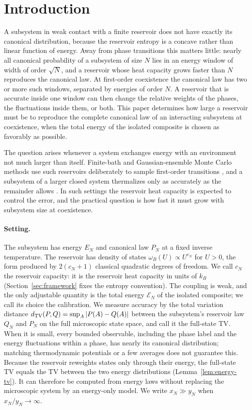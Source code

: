 \section{Introduction}
\label{sec:introduction}

A subsystem in weak contact with a finite reservoir does not have
exactly its canonical distribution, because the reservoir entropy is a
concave rather than linear function of energy. Away from phase
transitions this matters little: nearly all canonical probability of a
subsystem of size $N$ lies in an energy window of width of order
$\sqrt N$, and a reservoir whose heat capacity grows faster than $N$
reproduces the canonical law. At first-order coexistence the canonical
law has two or more such windows, separated by energies of order $N$.
A reservoir that is accurate inside one window can then change the
relative weights of the phases, the fluctuations inside them, or both.
This paper determines how large a reservoir must be to reproduce the
complete canonical law of an interacting subsystem at coexistence, when
the total energy of the isolated composite is chosen as favorably as
possible.

The question arises whenever a system exchanges energy with an
environment not much larger than itself. Finite-bath and
Gaussian-ensemble Monte Carlo methods use such reservoirs deliberately
to sample first-order transitions
\cite{ChallaHetherington1988PRA,GriffinMattySwendsen2017}, and a
subsystem of a larger closed system thermalizes only as accurately as
the remainder allows \cite{RieraGogolinEisert2012}. In such settings
the reservoir heat capacity is expected to control the error, and the
practical question is how fast it must grow with subsystem size at
coexistence.

\paragraph{Setting.}
The subsystem has energy $E_N$ and canonical law $P_N$ at a fixed
inverse temperature. The reservoir has density of states
$\omega_B(U)\propto U^{c_N}$ for $U>0$, the form produced by
$2(c_N+1)$ classical quadratic degrees of freedom. We call $c_N$ the
reservoir capacity: it is the reservoir heat capacity in units of $k_B$
(Section~\ref{sec:framework} fixes the entropy convention). The coupling
is weak, and the only adjustable quantity is the total energy
$\mathcal E_N$ of the isolated composite; we call its choice the
calibration. We measure accuracy by the total variation distance
$d_{\mathrm{TV}}(P,Q)=\sup_A|P(A)-Q(A)|$ between the subsystem's reservoir law $Q_N$
and $P_N$ on the full microscopic state space, and call it the
full-state TV. When it is small, every bounded observable, including the
phase label and the energy fluctuations within a phase, has nearly its
canonical distribution; matching thermodynamic potentials or a few
averages does not guarantee this. Because the reservoir reweights states
only through their energy, the full-state TV equals the TV between the
two energy distributions (Lemma~\ref{lem:energy-tv}). It can therefore
be computed from energy laws without replacing the microscopic system by
an energy-only model. We write $x_N\gg y_N$ when $x_N/y_N\to\infty$.

